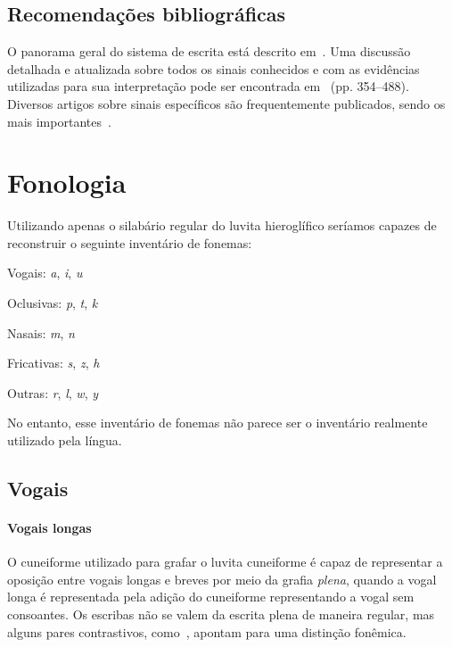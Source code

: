\subsection{Recomendações bibliográficas}

O panorama geral do sistema de escrita está descrito
em~\citet[p. 155ff.]{HawkinsScripts}.
Uma discussão detalhada e atualizada sobre todos os sinais conhecidos e com
as evidências utilizadas para sua interpretação pode ser encontrada
em~ (pp. 354--488).
Diversos artigos sobre sinais específicos são frequentemente publicados, sendo
os mais
importantes~\citet{HawkinsMorpurgoNeumann1974,Rieken2008,RiekenYakubovich2010}.

\section{Fonologia}

Utilizando apenas o silabário regular do luvita hieroglífico seríamos capazes de
reconstruir o seguinte inventário de fonemas:

\begin{compactitem}
	\item Vogais: \emph{a}, \emph{i}, \emph{u}
	\item Oclusivas: \emph{p}, \emph{t}, \emph{k}
	\item Nasais: \emph{m}, \emph{n}
	\item Fricativas: \emph{s}, \emph{z}, \emph{h}
	\item Outras: \emph{r}, \emph{l}, \emph{w}, \emph{y}
\end{compactitem}
No entanto, esse inventário de fonemas não parece ser o inventário realmente
utilizado pela língua.

\subsection{Vogais}

\paragraph{Vogais longas}
O cuneiforme utilizado para grafar o luvita cuneiforme é capaz de representar
a oposição entre vogais longas e
breves por meio da grafia \emph{plena}, quando a vogal longa é representada pela
adição do cuneiforme representando a vogal sem consoantes.
Os escribas não se valem da escrita plena de maneira regular, mas alguns pares
contrastivos, como~\Next, apontam para uma distinção fonêmica.

